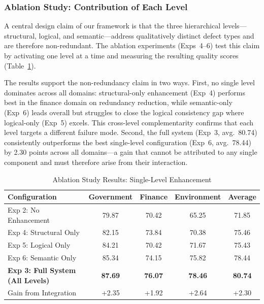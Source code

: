 \documentclass[runningheads]{llncs}
\begin{document}
\subsubsection{Ablation Study: Contribution of Each Level}

A central design claim of our framework is that the three hierarchical levels—structural, logical, and semantic—address qualitatively distinct defect types and are therefore non-redundant. The ablation experiments (Exps~4--6) test this claim by activating one level at a time and measuring the resulting quality scores (Table~\ref{tab:ablation_single}).

The results support the non-redundancy claim in two ways. First, no single level dominates across all domains: structural-only enhancement (Exp~4) performs best in the finance domain on redundancy reduction, while semantic-only (Exp~6) leads overall but struggles to close the logical consistency gap where logical-only (Exp~5) excels. This cross-level complementarity confirms that each level targets a different failure mode. Second, the full system (Exp~3, avg.\ 80.74) consistently outperforms the best single-level configuration (Exp~6, avg.\ 78.44) by 2.30 points across all domains—a gain that cannot be attributed to any single component and must therefore arise from their interaction.

\begin{table}[H]
    \centering
    \caption{Ablation Study Results: Single-Level Enhancement}
    \label{tab:ablation_single}
    \begin{tabularx}{\textwidth}{l c c c c}
    \toprule
    Configuration & Government & Finance & Environment & Average \\
    \midrule
    Exp 2: No Enhancement & 79.87 & 70.42 & 65.25 & 71.85 \\
    \midrule
    Exp 4: Structural Only & 82.15 & 73.84 & 70.38 & 75.46 \\
    Exp 5: Logical Only & 84.21 & 70.42 & 71.67 & 75.43 \\
    Exp 6: Semantic Only & 85.34 & 74.15 & 75.82 & 78.44 \\
    \midrule
    \textbf{Exp 3: Full System (All Levels)} & \textbf{87.69} & \textbf{76.07} & \textbf{78.46} & \textbf{80.74} \\
    \midrule
    Gain from Integration & +2.35 & +1.92 & +2.64 & +2.30 \\
    \bottomrule
    \end{tabularx}
\end{table}
\end{document}
